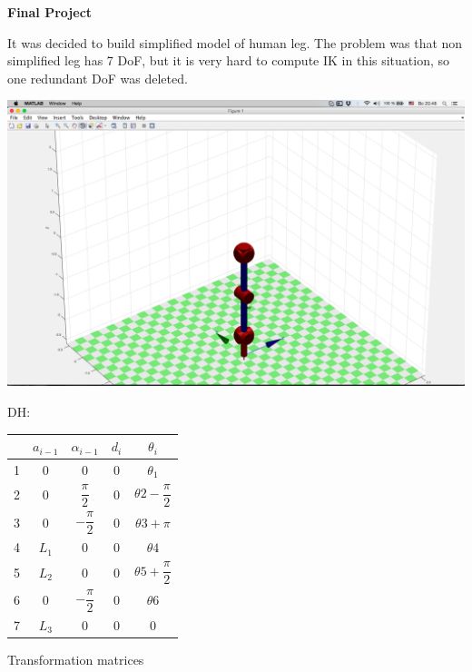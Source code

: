 \documentclass[12pt]{article}
\begin{document}


\begin{center}
\textbf{Final Project}
\end{center}

It was decided to build simplified model of human leg. The problem was that non simplified leg has 7 DoF, but it is very hard to compute IK in this situation, so one redundant DoF was deleted.

\bigskip
\bigskip
\bigskip 

\begin{center}
  \includegraphics[width=15cm]{main}
\end{center}

DH:
\\
\begin{tabular}{|c|c|c|c|c|}
\hline
 & $a_{i-1}$ & $\alpha_{i-1}$ & $d_i$ & $\theta_i$ \\
 \hline
 1 & 0 & 0 & 0 & $\theta_1$\\
 2 & 0 & $\dfrac{\pi}{2}$ & 0 & $\theta2 - \dfrac{\pi}{2}$\\
 3 & 0 & $-\dfrac{\pi}{2}$ & 0 & $\theta3 + \pi$\\
 4 & $L_1$  & 0 & 0 & $\theta4$\\
 5 & $L_2$ & 0 & 0 & $\theta5 + \dfrac{\pi}{2}$\\
 6 & 0 & $-\dfrac{\pi}{2}$ & 0 & $\theta6$\\
 7 & $L_3$ & 0 & 0 & 0\\ 
\hline
\end{tabular}

\bigskip

Transformation matrices
\end{document}
